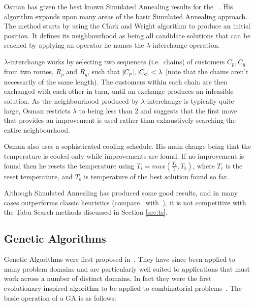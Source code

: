 Osman has given the best known Simulated Annealing results for the \VRP~\cite{Osman:1993}. His algorithm expands upon many areas of the basic Simulated Annealing approach. The method starts by using the Clark and Wright algorithm to produce an initial position. It defines its neighbourhood as being all candidate solutions that can be reached by applying an operator he names the $\lambda$-interchange operation.

$\lambda$-interchange works by selecting two sequences (i.e.~chains) of customers $C_p, C_q$ from two routes, $R_p$ and $R_q$, such that $|C_p|, |C_q| < \lambda$ (note that the chains aren't necessarily of the same length). The customers within each chain are then exchanged with each other in turn, until an exchange produces an infeasible solution. As the neighbourhood produced by $\lambda$-interchange is typically quite large, Osman restricts $\lambda$ to being less than 2 and suggests that the first move that provides an improvement is used rather than exhaustively searching the entire neighbourhood.


Osman also uses a sophisticated cooling schedule. His main change being that the temperature is cooled only while improvements are found. If no improvement is found then he resets the temperature using $T_i = max(\frac{T_r}{2}, T_b)$, where $T_r$ is the reset temperature, and $T_b$ is temperature of the best solution found so far. 

Although Simulated Annealing has produced some good results, and in many cases outperforms classic heuristics (compare~\cite{Laporte:1999} with~\cite{GLP:1999}), it is not competitive with the Tabu Search methods discussed in Section \ref{sec:ts}.

\subsection{Genetic Algorithms}

Genetic Algorithms were first proposed in~\cite{Holland:1975}. They have since been applied to many problem domains and are particularly well suited to applications that must work across a number of distinct domains. In fact they were the first evolutionary-inspired algorithm to be applied to combinatorial problems~\cite{Potvin:2009}. The basic operation of a GA is as follows:

